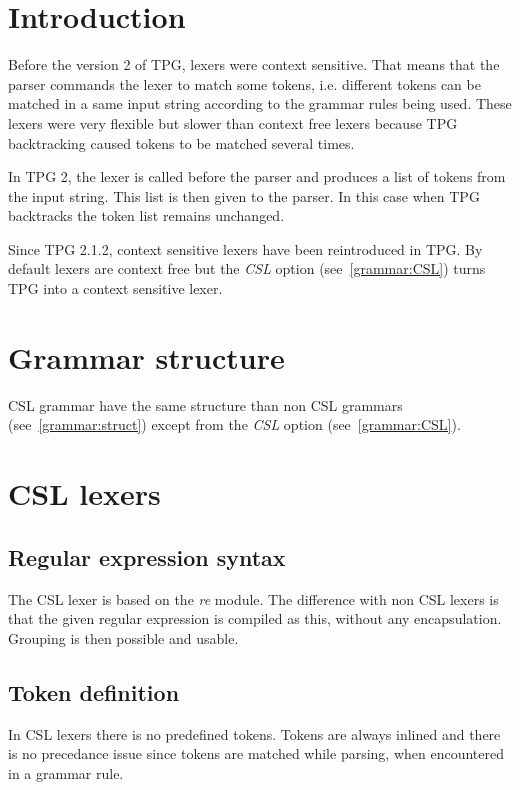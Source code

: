 \section{Introduction}

Before the version 2 of TPG, lexers were context sensitive.
That means that the parser commands the lexer to match some tokens, i.e. different tokens can be matched in a same input string according to the grammar rules being used.
These lexers were very flexible but slower than context free lexers because TPG backtracking caused tokens to be matched several times.

In TPG 2, the lexer is called before the parser and produces a list of tokens from the input string.
This list is then given to the parser.
In this case when TPG backtracks the token list remains unchanged.

Since TPG 2.1.2, context sensitive lexers have been reintroduced in TPG.
By default lexers are context free but the \emph{CSL} option (see~\ref{grammar:CSL}) turns TPG into a context sensitive lexer.

\section{Grammar structure}

CSL grammar have the same structure than non CSL grammars (see~\ref{grammar:struct}) except from the \emph{CSL} option (see~\ref{grammar:CSL}).

\section{CSL lexers}

\subsection{Regular expression syntax}

The CSL lexer is based on the \emph{re} module.
The difference with non CSL lexers is that the given regular expression is compiled as this, without any encapsulation.
Grouping is then possible and usable.

\subsection{Token definition}

In CSL lexers there is no predefined tokens.
Tokens are always inlined and there is no precedance issue since tokens are matched while parsing, when encountered in a grammar rule.

